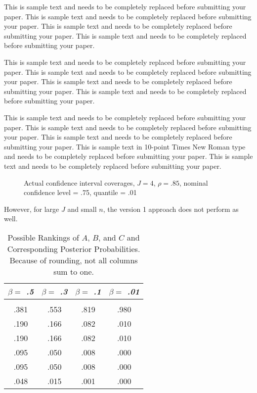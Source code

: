 \documentclass{../../tex_template/asaproc}
\begin{document}
This is sample text and needs to be completely replaced before submitting your paper. This is sample text and needs to be completely replaced before submitting your paper. This is sample text and needs to be completely replaced before submitting your paper. This is sample text and needs to be completely replaced before submitting your paper.

This is sample text and needs to be completely replaced before submitting your paper. This is sample text and needs to be completely replaced before submitting your paper.  This is sample text and needs to be completely replaced before submitting your paper. This is sample text and needs to be completely replaced before submitting your paper.

This is sample text and needs to be completely replaced before submitting your paper. This is sample text and needs to be completely replaced before submitting your paper. This is sample text and needs to be completely replaced before submitting your paper. This is sample text in 10-point Times New Roman type and needs to be completely replaced before submitting your paper. This is sample text and needs to be completely replaced before submitting your paper.


\begin{figure*}
\vspace{12pc}
\caption{Actual confidence interval coverages,
$J = 4$, $\rho = .85$, nominal confidence level = .75,
quantile = .01}
\end{figure*}
However, for large $J$ and small $n$, the version 1 approach does not perform as well.


\begin{table}[b]
\caption{\enspace Possible Rankings of $A$, $B$, and $C$ and Corresponding 
Posterior Probabilities.  Because of rounding, not all columns sum to 
one.}\label{tab1}
\begin{tabular*}{\hsize}{@{\extracolsep{\fill}}cccc}
\\[-5pt]
\multicolumn{1}{c}{\it $\beta =$ .5} & 
\multicolumn{1}{c}{\it $\beta =$ .3} & 
\multicolumn{1}{c}{\it $\beta =$ .1} & 
\multicolumn{1}{c}{\it $\beta =$ .01}\\
\hline
\\[-5pt]
.381 & .553 & .819 & .980 \\ 
        .190 & .166 & .082 & .010 \\
        .190 & .166 & .082 & .010 \\
        .095 & .050 & .008 & .000 \\
         .095 &  .050 &  .008 &  .000 \\
         .048 &  .015 &  .001 &   .000 \\
\hline
\end{tabular*}
\end{table} 
\end{document}
